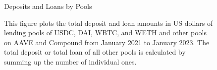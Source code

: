 \clearpage
\newpage


\begin{landscape}
\begin{figure}[ht!]
\centering
\caption{Deposits and Loans by Pools}\label{fig:deposit_loan_bypool}
\caption*{This figure plots the total deposit and loan amounts in US dollars of lending pools of USDC, DAI, WBTC, and WETH and other pools on AAVE and Compound from January 2021 to January 2023. The total deposit or total loan of all other pools is calculated by summing up the number of individual ones. }

\centering
{}


\end{figure}

\end{landscape}


